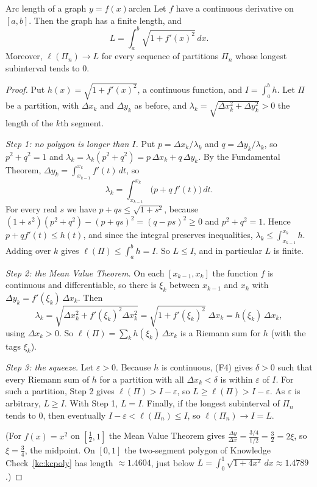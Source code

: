 \documentclass[11pt]{article}
\begin{document}
\begin{thm}{Arc length of a graph $y=f(x)$}{arclen}
Let $f$ have a continuous derivative on $[a,b]$. Then the graph has a finite length, and
\[
L=\int_a^b\sqrt{1+f'(x)^2}\,dx .
\]
Moreover, $\ell(\Pi_n)\to L$ for every sequence of partitions $\Pi_n$ whose longest subinterval tends to $0$.
\end{thm}
\begin{proof}
Put $h(x)=\sqrt{1+f'(x)^2}$, a continuous function, and $I=\int_a^bh$. Let $\Pi$ be a partition, with $\Delta x_k$ and $\Delta y_k$ as before, and $\lambda_k=\sqrt{\Delta x_k^2+\Delta y_k^2}>0$ the length of the $k$th segment.

\emph{Step 1: no polygon is longer than $I$.} Put $p=\Delta x_k/\lambda_k$ and $q=\Delta y_k/\lambda_k$, so $p^2+q^2=1$ and $\lambda_k=\lambda_k(p^2+q^2)=p\,\Delta x_k+q\,\Delta y_k$. By the Fundamental Theorem, $\Delta y_k=\int_{x_{k-1}}^{x_k}f'(t)\,dt$, so
\[
\lambda_k=\int_{x_{k-1}}^{x_k}\bigl(p+q\,f'(t)\bigr)\,dt .
\]
For every real $s$ we have $p+qs\le\sqrt{1+s^2}$, because $(1+s^2)(p^2+q^2)-(p+qs)^2=(q-ps)^2\ge0$ and $p^2+q^2=1$. Hence $p+qf'(t)\le h(t)$, and since the integral preserves inequalities, $\lambda_k\le\int_{x_{k-1}}^{x_k}h$. Adding over $k$ gives $\ell(\Pi)\le\int_a^bh=I$. So $L\le I$, and in particular $L$ is finite.

\emph{Step 2: the Mean Value Theorem.} On each $[x_{k-1},x_k]$ the function $f$ is continuous and differentiable, so there is $\xi_k$ between $x_{k-1}$ and $x_k$ with $\Delta y_k=f'(\xi_k)\,\Delta x_k$. Then
\[
\lambda_k=\sqrt{\Delta x_k^2+f'(\xi_k)^2\Delta x_k^2}=\sqrt{1+f'(\xi_k)^2}\;\Delta x_k=h(\xi_k)\,\Delta x_k ,
\]
using $\Delta x_k>0$. So $\ell(\Pi)=\sum_kh(\xi_k)\,\Delta x_k$ is a Riemann sum for $h$ (with the tags $\xi_k$).

\emph{Step 3: the squeeze.} Let $\varepsilon>0$. Because $h$ is continuous, (F4) gives $\delta>0$ such that every Riemann sum of $h$ for a partition with all $\Delta x_k<\delta$ is within $\varepsilon$ of $I$. For such a partition, Step 2 gives $\ell(\Pi)>I-\varepsilon$, so $L\ge\ell(\Pi)>I-\varepsilon$. As $\varepsilon$ is arbitrary, $L\ge I$. With Step 1, $L=I$. Finally, if the longest subinterval of $\Pi_n$ tends to $0$, then eventually $I-\varepsilon<\ell(\Pi_n)\le I$, so $\ell(\Pi_n)\to I=L$.

(For $f(x)=x^2$ on $[\frac12,1]$ the Mean Value Theorem gives $\frac{\Delta y}{\Delta x}=\frac{3/4}{1/2}=\frac32=2\xi$, so $\xi=\frac34$, the midpoint. On $[0,1]$ the two-segment polygon of Knowledge Check~\ref{kc:kcpoly} has length $\approx1.4604$, just below $L=\int_0^1\sqrt{1+4x^2}\,dx\approx1.4789$.)
\end{proof}
\end{document}
